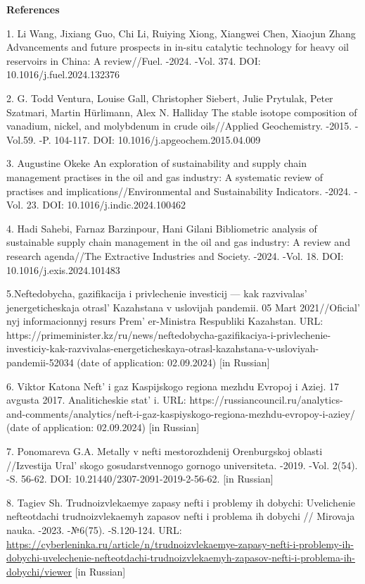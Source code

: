 \begin{center}
  {\bfseries References}
  \end{center}
  \begin{references}


1. Li Wang, Jixiang Guo, Chi Li, Ruiying Xiong, Xiangwei Chen, Xiaojun
Zhang Advancements and future prospects in in-situ catalytic technology
for heavy oil reservoirs in China: A review//Fuel. -2024. -Vol. 374.
DOI: 10.1016/j.fuel.2024.132376

2. G. Todd Ventura, Louise Gall, Christopher Siebert, Julie Prytulak,
Peter Szatmari, Martin Hürlimann, Alex N. Halliday The stable isotope
composition of vanadium, nickel, and molybdenum in crude oils//Applied
Geochemistry. -2015. -Vol.59. -P. 104-117. DOI:
10.1016/j.apgeochem.2015.04.009

3. Augustine Okeke An exploration of sustainability and supply chain
management practises in the oil and gas industry: A systematic review of
practises and implications//Environmental and Sustainability Indicators.
-2024. -Vol. 23. DOI: 10.1016/j.indic.2024.100462

4. Hadi Sahebi, Farnaz Barzinpour, Hani Gilani Bibliometric analysis of
sustainable supply chain management in the oil and gas industry: A
review and research agenda//The Extractive Industries and Society.
-2024. -Vol. 18. DOI: 10.1016/j.exis.2024.101483

5.Neftedobycha, gazifikacija i privlechenie investicij --- kak
razvivalas'{} jenergeticheskaja otrasl'{}
Kazahstana v uslovijah pandemii. 05 Mart
2021//Oficial' nyj informacionnyj resurs
Prem' er-Ministra Respubliki Kazahstan. URL:
https://primeminister.kz/ru/news/neftedobycha-gazifikaciya-i-privlechenie-investiciy-kak-razvivalas-energeticheskaya-otrasl-kazahstana-v-usloviyah-pandemii-52034
(date of application: 02.09.2024) {[}in Russian{]}

6. Viktor Katona Neft'{} i gaz Kaspijskogo regiona mezhdu
Evropoj i Aziej. 17 avgusta 2017. Analiticheskie stat' i.
URL:
https://russiancouncil.ru/analytics-and-comments/analytics/neft-i-gaz-kaspiyskogo-regiona-mezhdu-evropoy-i-aziey/
(date of application: 02.09.2024) {[}in Russian{]}

7. Ponomareva G.A. Metally v nefti mestorozhdenij Orenburgskoj oblasti
//Izvestija Ural' skogo gosudarstvennogo gornogo
universiteta. -2019. -Vol. 2(54). -S. 56-62. DOI:
10.21440/2307-2091-2019-2-56-62. {[}in Russian{]}

8. Tagiev Sh. Trudnoizvlekaemye zapasy nefti i problemy ih dobychi:
Uvelichenie nefteotdachi trudnoizvlekaemyh zapasov nefti i problema ih
dobychi // Mirovaja nauka. -2023. -№6(75). -S.120-124. URL:
\url{https://cyberleninka.ru/article/n/trudnoizvlekaemye-zapasy-nefti-i-problemy-ih-dobychi-uvelechenie-nefteotdachi-trudnoizvlekaemyh-zapasov-nefti-i-problema-ih-dobychi/viewer}
{[}in Russian{]}


\end{references}
